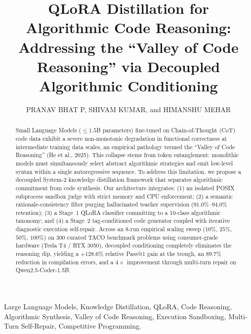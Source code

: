 \documentclass{ieeeaccess}
\begin{document}

\title{QLoRA Distillation for Algorithmic Code Reasoning: Addressing the ``Valley of Code Reasoning'' via Decoupled Algorithmic Conditioning}

\author{\uppercase{Pranav Bhat P}, \uppercase{Shivam Kumar}, and \uppercase{Himanshu Mehar}}
\markboth{}{}


\begin{abstract}
Small Language Models ($\le 1.5$B parameters) fine-tuned on Chain-of-Thought (CoT) code data exhibit a severe non-monotonic degradation in functional correctness at intermediate training data scales, an empirical pathology termed the ``Valley of Code Reasoning'' (He et al., 2025). This collapse stems from token entanglement: monolithic models must simultaneously select abstract algorithmic strategies and emit low-level syntax within a single autoregressive sequence. To address this limitation, we propose a decoupled System-2 knowledge distillation framework that separates algorithmic commitment from code synthesis. Our architecture integrates: (1) an isolated POSIX subprocess sandbox judge with strict memory and CPU enforcement; (2) a semantic rationale-consistency filter purging hallucinated teacher supervision ($91.0\%\text{--}94.0\%$ retention); (3) a Stage~1 QLoRA classifier committing to a 10-class algorithmic taxonomy; and (4) a Stage~2 tag-conditioned code generator coupled with iterative diagnostic execution self-repair. Across an 8-run empirical scaling sweep ($10\%$, $25\%$, $50\%$, $100\%$) on 300 curated TACO benchmark problems using consumer-grade hardware (Tesla T4 / RTX 3050), decoupled conditioning completely eliminates the reasoning dip, yielding a $+128.6\%$ relative Pass@1 gain at the trough, an $89.7\%$ reduction in compilation errors, and a $4\times$ improvement through multi-turn repair on Qwen2.5-Coder-1.5B.
\end{abstract}

\begin{keywords}
Large Language Models, Knowledge Distillation, QLoRA, Code Reasoning, Algorithmic Synthesis, Valley of Code Reasoning, Execution Sandboxing, Multi-Turn Self-Repair, Competitive Programming.
\end{keywords}

\titlepgskip=-15pt
\maketitle
\end{document}
